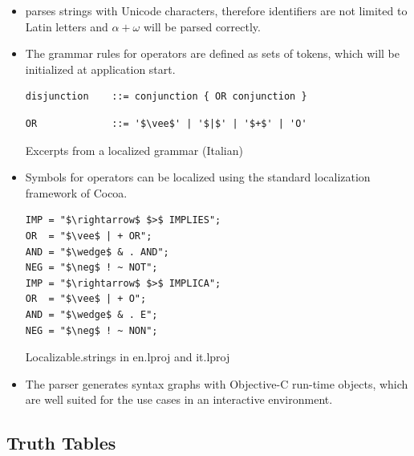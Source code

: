 \begin{itemize}

\item \Nyaya parses strings with Unicode characters, 
therefore identifiers are not limited to Latin letters and
$\alpha + \omega$ will be parsed correctly. 

\item The grammar rules for operators are defined as sets of tokens, 
which will be initialized at application start. 

\begin{table}[htdp]
\begin{center}
\begin{lstlisting}[mathescape,firstnumber=7]
disjunction    ::= conjunction { OR conjunction }
\end{lstlisting}
\begin{lstlisting}[mathescape,firstnumber=15]
OR             ::= '$\vee$' | '$|$' | '$+$' | 'O'
\end{lstlisting}
\caption{Excerpts from a localized grammar (Italian)}
\label{tab:LocalizedEBNF}
\end{center}
\end{table}

\item Symbols for operators
can be localized using the standard localization framework of Cocoa.

\begin{table}[htdp]
\begin{center}
\begin{lstlisting}[mathescape,numbers=none,multicols=2]
IMP = "$\rightarrow$ $>$ IMPLIES";
OR  = "$\vee$ | + OR";
AND = "$\wedge$ & . AND";
NEG = "$\neg$ ! ~ NOT";
IMP = "$\rightarrow$ $>$ IMPLICA";
OR  = "$\vee$ | + O";
AND = "$\wedge$ & . E";
NEG = "$\neg$ ! ~ NON";
\end{lstlisting}
\caption{Localizable.strings in en.lproj and it.lproj}
\label{tab:LocalizableStrings}
\end{center}
\end{table}


\item The parser generates syntax graphs with Objective-C run-time objects,
which are well suited for the use cases in an interactive environment.

\end{itemize}

\subsection{Truth Tables}

